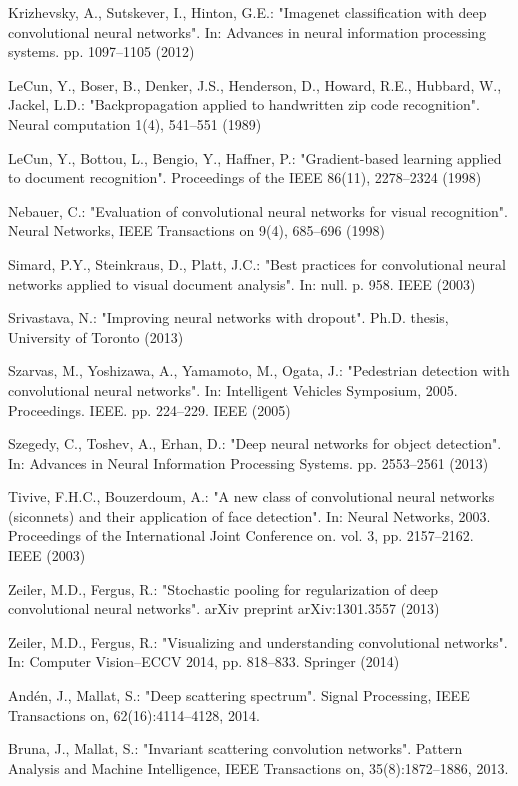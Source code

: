 \documentclass{article}
\begin{document}
\begin{thebibliography}{99}
 Krizhevsky, A., Sutskever, I., Hinton, G.E.: "Imagenet classification with deep convolutional neural networks". In: Advances in neural information processing systems. pp. 1097–1105 (2012)

 LeCun, Y., Boser, B., Denker, J.S., Henderson, D., Howard, R.E., Hubbard, W., Jackel, L.D.: "Backpropagation applied to handwritten zip code recognition". Neural computation 1(4), 541–551 (1989)

 LeCun, Y., Bottou, L., Bengio, Y., Haffner, P.: "Gradient-based learning applied to document recognition". Proceedings of the IEEE 86(11), 2278–2324 (1998)

 Nebauer, C.: "Evaluation of convolutional neural networks for visual recognition". Neural Networks, IEEE Transactions on 9(4), 685–696 (1998)

 Simard, P.Y., Steinkraus, D., Platt, J.C.: "Best practices for convolutional neural networks applied to visual document analysis". In: null. p. 958. IEEE (2003)

 Srivastava, N.: "Improving neural networks with dropout". Ph.D. thesis, University of Toronto (2013)

 Szarvas, M., Yoshizawa, A., Yamamoto, M., Ogata, J.: "Pedestrian detection with convolutional neural networks". In: Intelligent Vehicles Symposium, 2005. Proceedings. IEEE. pp. 224–229. IEEE (2005)

 Szegedy, C., Toshev, A., Erhan, D.: "Deep neural networks for object detection". In: Advances in Neural Information Processing Systems. pp. 2553–2561 (2013)

 Tivive, F.H.C., Bouzerdoum, A.: "A new class of convolutional neural networks (siconnets) and their application of face detection". In: Neural Networks, 2003. Proceedings of the International Joint Conference on. vol. 3, pp. 2157–2162. IEEE (2003)

 Zeiler, M.D., Fergus, R.: "Stochastic pooling for regularization of deep convolutional neural networks". arXiv preprint arXiv:1301.3557 (2013)

 Zeiler, M.D., Fergus, R.: "Visualizing and understanding convolutional networks". In: Computer Vision–ECCV 2014, pp. 818–833. Springer (2014)

 Andén, J., Mallat, S.: "Deep scattering spectrum". Signal Processing, IEEE Transactions on, 62(16):4114–4128, 2014.

 Bruna, J., Mallat, S.: "Invariant scattering convolution networks". Pattern Analysis and Machine Intelligence, IEEE Transactions on, 35(8):1872–1886, 2013.


\end{thebibliography}
\end{document}
